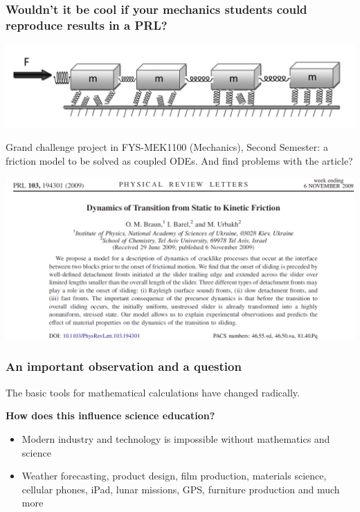\documentclass{beamer}
\begin{document}
\begin{frame}
\frametitle{Wouldn't it be cool if your mechanics students could reproduce results in a PRL?}

\begin{block}{}


\centerline{\includegraphics[width=0.5\linewidth]{figures/prl1.png}}



Grand challenge project in FYS-MEK1100 (Mechanics), Second Semester: a friction model to be solved as coupled ODEs. And find problems with the article?
\end{block}
\begin{block}{}


\centerline{\includegraphics[width=0.5\linewidth]{figures/prl2.png}}


\end{block}
\end{frame}

\begin{frame}
\frametitle{An important observation and a  question}

\begin{block}{}

The basic tools for mathematical calculations have changed radically.

\textbf{How does this influence science education?}

\begin{itemize}
\item Modern industry and technology is impossible without mathematics and science

\item Weather forecasting, product design, film production, materials science, cellular phones, iPad, lunar missions, GPS, furniture production and much more
\end{itemize}

\noindent
\end{block}
\end{frame}
\end{document}

